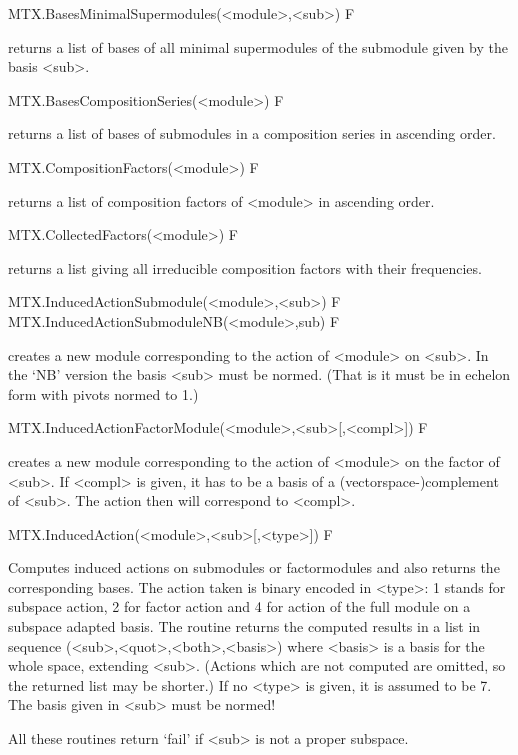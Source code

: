 \>MTX.BasesMinimalSupermodules(<module>,<sub>) F

returns a list of bases of all minimal supermodules of the submodule given by
the basis <sub>.

\>MTX.BasesCompositionSeries(<module>) F

returns a list of bases of submodules in a composition series in ascending
order.

\>MTX.CompositionFactors(<module>) F

returns a list of composition factors of <module> in ascending order.

\>MTX.CollectedFactors(<module>) F

returns a list giving all irreducible composition factors with their
frequencies.


\>MTX.InducedActionSubmodule(<module>,<sub>) F
\>MTX.InducedActionSubmoduleNB(<module>,sub) F

creates a new module corresponding to the action of <module> on <sub>. In
the `NB' version the basis <sub> must be normed. (That is it must be in
echelon form with pivots normed to 1.)

\>MTX.InducedActionFactorModule(<module>,<sub>[,<compl>]) F

creates a new module corresponding to the action of <module> on the
factor of <sub>. If <compl> is given, it has to be a basis of a
(vectorspace-)complement of <sub>. The action then will correspond to
<compl>.

\>MTX.InducedAction(<module>,<sub>[,<type>]) F

Computes induced actions on submodules or factormodules and also returns the
corresponding bases. The action taken is binary encoded in <type>:
1 stands for subspace action, 2 for
factor action and 4 for action of the full module
on a subspace adapted basis.
The routine returns the computed results in a list in sequence
(<sub>,<quot>,<both>,<basis>) where <basis> is a basis for the whole space,
extending <sub>. (Actions which are not computed are omitted, so the
returned list may be shorter.)
If no <type> is given, it is assumed to be 7.
The basis given in <sub> must be normed!

All these routines return `fail' if <sub> is not a proper subspace.


